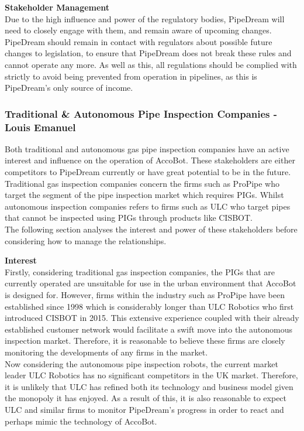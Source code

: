 \documentclass[11pt]{article}		%
\begin{document}
		    \textbf{Stakeholder Management}
		    \\
		    Due to the high influence and power of the regulatory bodies, PipeDream will need to closely engage with them, and remain aware of upcoming changes.
		    PipeDream should remain in contact with regulators about possible future changes to legislation, to ensure that PipeDream does not break these rules and cannot operate any more.
		    As well as this, all regulations should be complied with strictly to avoid being prevented from operation in pipelines, as this is PipeDream's only source of income.
		    
		\subsubsection[Traditional \& Autonomous Pipe Inspection Companies]{Traditional \& Autonomous Pipe Inspection Companies - Louis Emanuel}
		
            Both traditional and autonomous gas pipe inspection companies have an active interest and influence on the operation of AccoBot. These stakeholders are either competitors to PipeDream currently or have great potential to be in the future. Traditional gas inspection companies concern the firms such as ProPipe who target the segment of the pipe inspection market which requires PIGs. Whilst autonomous inspection companies refers to firms such as ULC who target pipes that cannot be inspected using PIGs through products like CISBOT. \\
            \hspace*{2ex}The following section analyses the interest and power of these stakeholders before considering how to manage the relationships.
            
            \textbf{Interest}
            \\
            Firstly, considering traditional gas inspection companies, the PIGs that are currently operated are unsuitable for use in the urban environment that AccoBot is designed for. However, firms within the industry such as ProPipe have been established since 1998 which is considerably longer than ULC Robotics who first introduced CISBOT in 2015. This extensive experience coupled with their already established customer network would facilitate a swift move into the autonomous inspection market. Therefore, it is reasonable to believe these firms are closely monitoring the developments of any firms in the market.
            \\
            \hspace*{2ex}Now considering the autonomous pipe inspection robots, the current market leader ULC Robotics has no significant competitors in the UK market. Therefore, it is unlikely that ULC has refined both its technology and business model given the monopoly it has enjoyed. As a result of this, it is also reasonable to expect ULC and similar firms to monitor PipeDream's progress in order to react and perhaps mimic the technology of AccoBot. 
            
\end{document}
